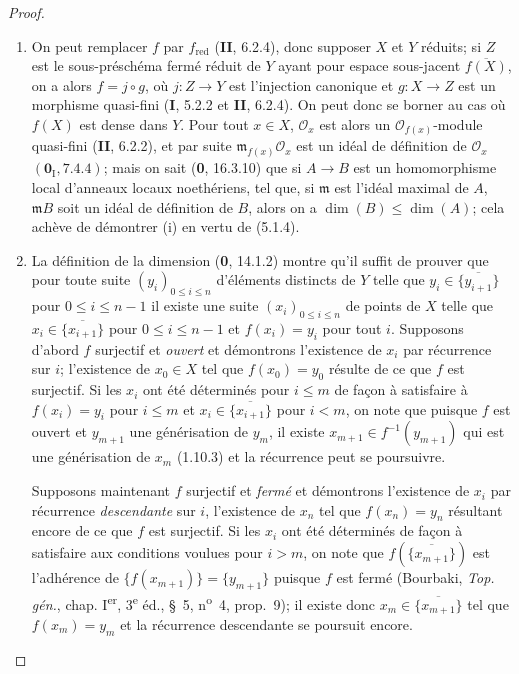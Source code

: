 \begin{proof}
\begin{enumerate}
\item[(i)] On peut remplacer $f$ par $f_{\mathrm{red}}$ (\textbf{II}, 6.2.4), donc
supposer $X$ et $Y$ réduits; si $Z$ est le sous-préschéma fermé réduit de $Y$
ayant pour espace sous-jacent $\overline{f(X)}$, on a alors $f=j\circ g$, où
$j:Z\to Y$ est l'injection canonique et $g:X\to Z$ est un morphisme
quasi-fini (\textbf{I}, 5.2.2 et \textbf{II}, 6.2.4). On peut donc se borner au cas où $f(X)$
est dense dans $Y$. Pour tout $x\in X$, $\mathcal O_x$ est alors un
$\mathcal O_{f(x)}$-module quasi-fini (\textbf{II}, 6.2.2), et par suite
$\mathfrak m_{f(x)}\mathcal O_x$ est un idéal de définition de $\mathcal O_x$
$(\mathbf{0}_{\mathrm I},7.4.4)$; mais on sait (\textbf{0}, 16.3.10) que si $A\to B$ est un
homomorphisme local d'anneaux locaux noethériens, tel que, si $\mathfrak m$
est l'idéal maximal de $A$, $\mathfrak mB$ soit un idéal de définition de
$B$, alors on a $\dim(B)\leq\dim(A)$; cela achève de démontrer (i) en vertu
de (5.1.4).

\item[(ii)] La définition de la dimension (\textbf{0}, 14.1.2) montre qu'il suffit de
prouver que pour toute suite $(y_i)_{0\leq i\leq n}$ d'éléments distincts de
$Y$ telle que $y_i\in\overline{\{y_{i+1}\}}$ pour $0\leq i\leq n-1$ il
existe une suite $(x_i)_{0\leq i\leq n}$ de points de $X$ telle que
$x_i\in\overline{\{x_{i+1}\}}$ pour $0\leq i\leq n-1$ et $f(x_i)=y_i$
pour tout $i$. Supposons d'abord $f$ surjectif et \emph{ouvert} et démontrons
l'existence de $x_i$ par récurrence sur $i$; l'existence de $x_0\in X$ tel
que $f(x_0)=y_0$ résulte de ce que $f$ est surjectif. Si les $x_i$ ont été
déterminés pour $i\leq m$ de façon à satisfaire à $f(x_i)=y_i$ pour
$i\leq m$ et $x_i\in\overline{\{x_{i+1}\}}$ pour $i<m$, on note que puisque
$f$ est ouvert et $y_{m+1}$ une générisation de $y_m$, il existe
$x_{m+1}\in f^{-1}(y_{m+1})$ qui est une générisation de $x_m$ (1.10.3) et
la récurrence peut se poursuivre.

Supposons maintenant $f$ surjectif et \emph{fermé} et démontrons l'existence de
$x_i$ par récurrence \emph{descendante} sur $i$, l'existence de $x_n$ tel que
$f(x_n)=y_n$ résultant encore de ce que $f$ est surjectif. Si les $x_i$ ont
été déterminés de façon à satisfaire aux conditions voulues pour $i>m$, on
note que $f(\overline{\{x_{m+1}\}})$ est l'adhérence de
$\{f(x_{m+1})\}=\{y_{m+1}\}$ puisque $f$
est fermé (Bourbaki,
\emph{Top. gén.}, chap. I\textsuperscript{er}, 3\textsuperscript{e} éd.,
\S~5, n\textsuperscript{o}~4, prop.~9); il existe donc
$x_m\in\overline{\{x_{m+1}\}}$ tel que $f(x_m)=y_m$ et la récurrence
descendante se poursuit encore.
\end{enumerate}
\end{proof}

